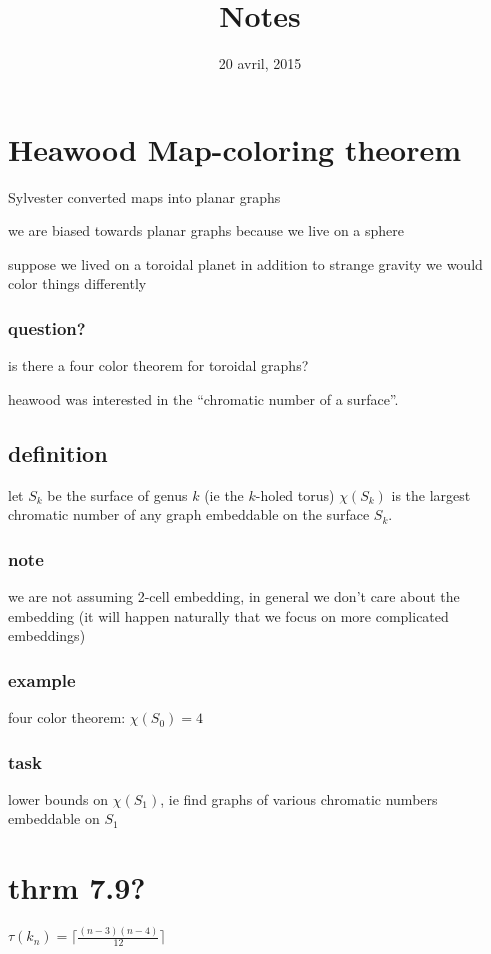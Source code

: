 \documentclass[letterpaper]{article}
\begin{document}
\title{Notes}
\date{20 avril, 2015}
\maketitle
\section*{Heawood Map-coloring theorem} 
Sylvester converted maps into planar graphs

we are biased towards planar graphs because we live on a sphere

suppose we lived on a toroidal planet in addition to strange gravity we would color things differently

\subsubsection*{question?}
is there a four color theorem for toroidal graphs?

heawood was interested in the ``chromatic number of a surface''.

\subsection*{definition}
let $S_k$ be the surface of genus $k$ (ie the $k$-holed torus) $\chi(S_k)$ is the largest chromatic number of any graph embeddable on the surface $S_k$.
\subsubsection*{note}
we are not assuming 2-cell embedding, in general we don't care about the embedding (it will happen naturally that we focus on more complicated embeddings)

\subsubsection*{example}
four color theorem: 
$\chi(S_0)=4$

\subsubsection*{task}
lower bounds on $\chi(S_1)$, ie find graphs of various chromatic numbers embeddable on $S_1$

\section*{thrm 7.9?}
$\tau(k_n)=\lceil\frac{(n-3)(n-4)}{12}\rceil$
\end{document}
